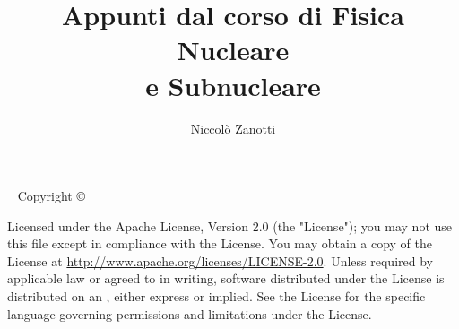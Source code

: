 \documentclass{tufte-book} %
\title{Appunti dal corso di Fisica Nucleare\\ e Subnucleare} %
\author{Niccolò Zanotti} %
\theoremstyle{definition}
\theoremstyle{theorem}
\theoremstyle{plain}
\theoremstyle{remark}
\theoremstyle{remark}
\newcommand{\monthyear}{\ifcase\month\or January\or February\or March\or April\or May\or June\or July\or August\or September\or October\or November\or December\fi\space\number\year} %
\newcommand{\openepigraph}[2]{ %
\begin{fullwidth}
\sffamily\large
\begin{doublespace}
\noindent\allcaps{#1}\\ %
\noindent\allcaps{#2} %
\end{doublespace}
\end{fullwidth}
}
\begin{document}
\frontmatter




\maketitle %


\newpage
\begin{fullwidth}
~\vfill
\thispagestyle{empty}
\setlength{\parindent}{0pt}
\setlength{\parskip}{\baselineskip}
Copyright \copyright\ \the\year\ \thanklessauthor

\par{}

\par{}

\par Licensed under the Apache License, Version 2.0 (the "License");
you may not use this file except in compliance with the License.
You may obtain a copy of the License at \url{http://www.apache.org/licenses/LICENSE-2.0}.
Unless required by applicable law or agreed to in writing, software
distributed under the License is distributed on an , either express or implied.
See the License for the specific language governing permissions and
limitations under the License.

\end{fullwidth}


\tableofcontents %
\end{document}
